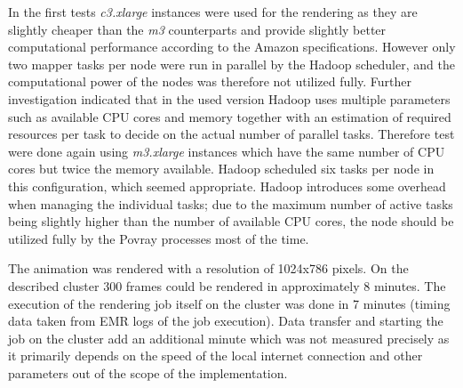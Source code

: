 \documentclass{article}
\begin{document}
In the first tests \emph{c3.xlarge} instances were used for the rendering as they are slightly cheaper than the \emph{m3} counterparts and provide slightly better computational performance according to the Amazon specifications. However only two mapper tasks per node were run in parallel by the Hadoop scheduler, and the computational power of the nodes was therefore not utilized fully. Further investigation indicated that in the used version Hadoop uses multiple parameters such as available CPU cores and memory together with an estimation of required resources per task to decide on the actual number of parallel tasks. Therefore test were done again using \emph{m3.xlarge} instances which have the same number of CPU cores but twice the memory available. Hadoop scheduled six tasks per node in this configuration, which seemed appropriate. Hadoop introduces some overhead when managing the individual tasks; due to the maximum number of active tasks being slightly higher than the number of available CPU cores, the node should be utilized fully by the Povray processes most of the time.

The animation was rendered with a resolution of 1024x786 pixels. On the described cluster 300 frames could be rendered in approximately 8 minutes. The execution of the rendering job itself on the cluster was done in 7 minutes (timing data taken from EMR logs of the job execution). Data transfer and starting the job on the cluster add an additional minute which was not measured precisely as it primarily depends on the speed of the local internet connection and other parameters out of the scope of the implementation.
\end{document}
